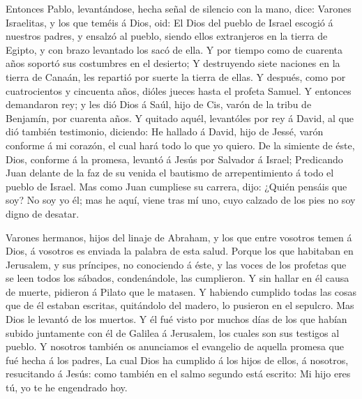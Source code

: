  Entonces Pablo, levantándose, hecha señal de silencio
con la mano, dice: Varones Israelitas, y los que teméis á Dios, oid:
 El Dios del pueblo de Israel escogió á nuestros padres,
y ensalzó al pueblo, siendo ellos extranjeros en la tierra de Egipto, y
con brazo levantado los sacó de ella.  Y por tiempo como
de cuarenta años soportó sus costumbres en el desierto; 
Y destruyendo siete naciones en la tierra de Canaán, les repartió por
suerte la tierra de ellas.  Y después, como por
cuatrocientos y cincuenta años, dióles jueces hasta el profeta Samuel.
 Y entonces demandaron rey; y les dió Dios á Saúl, hijo
de Cis, varón de la tribu de Benjamín, por cuarenta años.
 Y quitado aquél, levantóles por rey á David, al que dió
también testimonio, diciendo: He hallado á David, hijo de Jessé, varón
conforme á mi corazón, el cual hará todo lo que yo quiero.
 De la simiente de éste, Dios, conforme á la promesa,
levantó á Jesús por Salvador á Israel;  Predicando Juan
delante de la faz de su venida el bautismo de arrepentimiento á todo el
pueblo de Israel.  Mas como Juan cumpliese su carrera,
dijo: ¿Quién pensáis que soy? No soy yo él; mas he aquí, viene tras mí
uno, cuyo calzado de los pies no soy digno de desatar.

 Varones hermanos, hijos del linaje de Abraham, y los que
entre vosotros temen á Dios, á vosotros es enviada la palabra de esta
salud.  Porque los que habitaban en Jerusalem, y sus
príncipes, no conociendo á éste, y las voces de los profetas que se leen
todos los sábados, condenándole, las cumplieron.  Y sin
hallar en él causa de muerte, pidieron á Pilato que le matasen.
 Y habiendo cumplido todas las cosas que de él estaban
escritas, quitándolo del madero, lo pusieron en el sepulcro.
 Mas Dios le levantó de los muertos.  Y él
fué visto por muchos días de los que habían subido juntamente con él de
Galilea á Jerusalem, los cuales son sus testigos al pueblo.
 Y nosotros también os anunciamos el evangelio de aquella
promesa que fué hecha á los padres,  La cual Dios ha
cumplido á los hijos de ellos, á nosotros, resucitando á Jesús: como
también en el salmo segundo está escrito: Mi hijo eres tú, yo te he
engendrado hoy.

